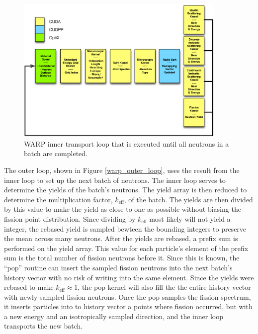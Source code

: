 \begin{figure}[h!] 
\centering
\includegraphics[width=0.9\textwidth]{graphics/warp_inner_loop.eps}
\caption{WARP inner transport loop that is executed until all neutrons in a batch are completed. \label{warp_inner_loop} }
\end{figure}

The outer loop, shown in Figure \ref{warp_outer_loop}, uses the result from the inner loop to set up the next batch of neutrons.  The inner loop serves to determine the yields of the batch's neutrons.  The yield array is then reduced to determine the multiplication factor, $k_\mathrm{eff}$, of the batch.  The yields are then divided by this value to make the yield as close to one as possible without biasing the fission point distribution.  Since dividing by $k_\mathrm{eff}$ most likely will not yield a integer, the rebased yield is sampled bewteen the bounding integers to preserve the mean across many neutrons.  After the yields are rebased, a prefix sum is performed on the yield array.  This value for each particle's element of the prefix sum is the total number of fission neutrons before it.  Since this is known, the ``pop'' routine can insert the sampled fission neutrons into the next batch's history vector with no risk of writing into the same element.  Since the yields were rebased to make $k_\mathrm{eff}\approx1$, the pop kernel will also fill the the entire history vector with newly-sampled fission neutrons.  Once the pop samples the fission spectrum, it inserts particles into to history vector a points where fission occurred, but with a new energy and an isotropically sampled direction, and the inner loop transports the new batch.

